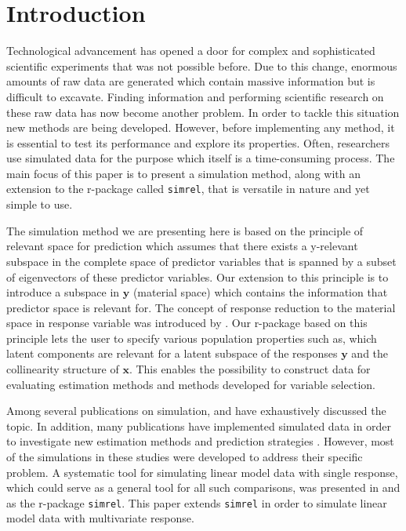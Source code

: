 \documentclass[review]{elsarticle}
\theoremstyle{definition}
\theoremstyle{definition}
\theoremstyle{remark}
\begin{document}
\section{Introduction}\label{introduction}

Technological advancement has opened a door for complex and
sophisticated scientific experiments that was not possible before. Due
to this change, enormous amounts of raw data are generated which contain
massive information but is difficult to excavate. Finding information
and performing scientific research on these raw data has now become
another problem. In order to tackle this situation new methods are being
developed. However, before implementing any method, it is essential to
test its performance and explore its properties. Often, researchers use
simulated data for the purpose which itself is a time-consuming process.
The main focus of this paper is to present a simulation method, along
with an extension to the r-package called \texttt{simrel}, that is
versatile in nature and yet simple to use.

The simulation method we are presenting here is based on the principle
of relevant space for prediction \citep{helland1994comparison} which
assumes that there exists a y-relevant subspace in the complete space of
predictor variables that is spanned by a subset of eigenvectors of these
predictor variables. Our extension to this principle is to introduce a
subspace in \(\mathbf{y}\) (material space) which contains the
information that predictor space is relevant for. The concept of
response reduction to the material space in response variable was
introduced by \citet{cook2010envelope}. Our r-package based on this
principle lets the user to specify various population properties such
as, which latent components are relevant for a latent subspace of the
responses \(\mathbf{y}\) and the collinearity structure of
\(\mathbf{x}\). This enables the possibility to construct data for
evaluating estimation methods and methods developed for variable
selection.

Among several publications on simulation, \citet{ripley2009stochastic}
and \citet{gamerman2006markov} have exhaustively discussed the topic. In
addition, many publications have implemented simulated data in order to
investigate new estimation methods and prediction strategies
\citep[see:][]{cook2015simultaneous, cook2013envelopes, helland2012near}.
However, most of the simulations in these studies were developed to
address their specific problem. A systematic tool for simulating linear
model data with single response, which could serve as a general tool for
all such comparisons, was presented in \citet{saebo2015simrel} and as
the r-package \texttt{simrel}. This paper extends \texttt{simrel} in
order to simulate linear model data with multivariate response.
\end{document}
